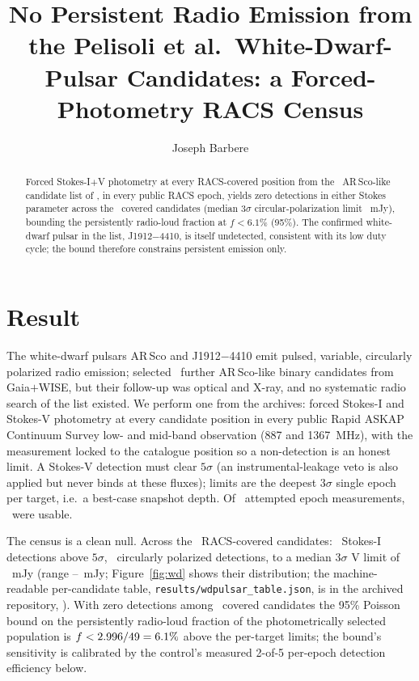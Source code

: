 \documentclass[RNAAS]{aastex631}
\newcommand{\code}[1]{\texttt{#1}}
\begin{document}
\title{No Persistent Radio Emission from the Pelisoli et al.\ White-Dwarf-Pulsar
Candidates: a Forced-Photometry RACS Census}

\author[0009-0008-3289-4447]{Joseph Barbere}

\begin{abstract}
Forced Stokes-I$+$V photometry at every RACS-covered position from the \wdNCand\
AR\,Sco-like candidate list of \citet{pelisoli2025}, in every public RACS epoch, yields zero detections in either
Stokes parameter across the \wdRealNCandCovered\ covered candidates (median $3\sigma$
circular-polarization limit \wdRealMedianVLimit~mJy), bounding the persistently
radio-loud fraction at $f < 6.1\%$ (95\%). The confirmed white-dwarf pulsar in the
list, J1912$-$4410, is itself undetected, consistent with its low duty cycle; the
bound therefore constrains persistent emission only.
\end{abstract}

\section{Result}

The white-dwarf pulsars AR\,Sco \citep{marsh2016} and J1912$-$4410 \citep{pelisoli2023}
emit pulsed, variable, circularly polarized radio emission; \citet{pelisoli2025}
selected \wdNCand\ further AR\,Sco-like binary candidates from Gaia$+$WISE, but their
follow-up was optical and X-ray, and no systematic radio search of the list existed.
We perform one from the archives: forced Stokes-I and Stokes-V photometry at every
candidate position in every public Rapid ASKAP Continuum Survey \citep[RACS;][]
{mcconnell2020} low- and mid-band observation (887 and 1367~MHz), with the measurement
locked to the catalogue position so a non-detection is an honest limit. A Stokes-V
detection must clear $5\sigma$ (an instrumental-leakage veto is also applied but never
binds at these fluxes); limits are the deepest $3\sigma$ single epoch per target,
i.e.\ a best-case snapshot depth. Of \wdRealNAttempted\ attempted epoch measurements,
\wdRealNUsed\ were usable.

The census is a clean null. Across the \wdRealNCandCovered\ RACS-covered candidates:
\wdRealNCandIDet\ Stokes-I detections above $5\sigma$, \wdRealNCandVDet\
circularly polarized detections, to a median $3\sigma$ V limit of
\wdRealMedianVLimit~mJy (range \wdRealVLimMin--\wdRealVLimMax~mJy; Figure~\ref{fig:wd} shows their
distribution; the machine-readable per-candidate table,
\code{results/wdpulsar\_table.json}, is in the archived repository,
\citealt{janskyresearch}). With zero detections among \wdRealNCovered\ covered
candidates the 95\% Poisson bound on the persistently radio-loud fraction of
the photometrically selected population is $f < 2.996/49 = 6.1\%$ above
the per-target limits; the bound's sensitivity is calibrated by the control's
measured 2-of-5 per-epoch detection efficiency below.
\end{document}
